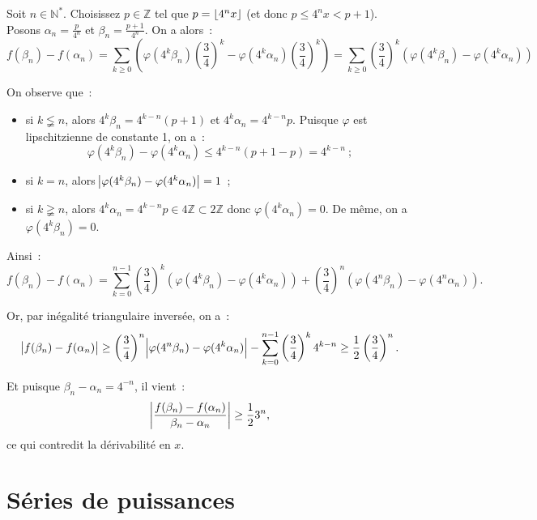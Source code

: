 \documentclass{report}
\theoremstyle{definition}
\theoremstyle{remark}
\numberwithin{equation}{section}
\newcommand{\Z}{\mathbb Z}
\newcommand{\N}{\mathbb N}
\newcommand{\Ns}{\N^{*}}
\DeclarePairedDelimiter{\floor}{\lfloor}{\rfloor}
\begin{document}
			Soit $n \in \Ns$. Choisissez $p \in \Z$ tel que $p = \floor {4^nx}$ (et donc $p \leq 4^nx < p+1$). Posons $\alpha_n = \frac p{4^n}$ et
			$\beta_n = \frac {p+1}{4^n}$. On a alors~:
			\begin{equation}
				f(\beta_n) - f(\alpha_n) = \sum_{k \geq 0}\left(\varphi(4^k\beta_n)\left(\frac 34\right)^k - \varphi(4^k\alpha_n)\left(\frac 34\right)^k\right)
				= \sum_{k \geq 0}\left(\frac 34\right)^k\left(\varphi(4^k\beta_n) - \varphi(4^k\alpha_n)\right)
			\end{equation}

			On observe que~:
			\begin{itemize}
				\item si $k \lneqq n$, alors $4^k\beta_n = 4^{k-n}(p+1)$ et $4^k\alpha_n = 4^{k-n}p$. Puisque $\varphi$ est lipschitzienne de constante 1, on a~:
					\begin{equation}
						\varphi(4^k\beta_n) - \varphi(4^k\alpha_n) \leq 4^{k-n}(p+1-p) = 4^{k-n}~;
					\end{equation}
				\item si $k = n$, alors $\abs {\varphi(4^k\beta_n) - \varphi(4^k\alpha_n)} = 1$~;
				\item si $k \gneqq n$, alors $4^k\alpha_n = 4^{k-n}p \in 4\Z \subset 2\Z$ donc $\varphi(4^k\alpha_n) = 0$.
					De même, on a $\varphi(4^k\beta_n) = 0$.
			\end{itemize}

			Ainsi~:
			\begin{equation}
				f(\beta_n) - f(\alpha_n) = \sum_{k=0}^{n-1}\left(\frac 34\right)^k\left(\varphi(4^k\beta_n) - \varphi(4^k\alpha_n)\right) +
				\left(\frac 34\right)^n\left(\varphi(4^n\beta_n) - \varphi(4^n\alpha_n)\right).
			\end{equation}

			Or, par inégalité triangulaire inversée, on a~:
			\begin{equation}
				\abs {f(\beta_n) - f(\alpha_n)} \geq \left(\frac 34\right)^n\abs {\varphi(4^n\beta_n) - \varphi(4^k\alpha_n)}
				- \sum_{k=0}^{n-1}\left(\frac 34\right)^k4^{k-n} \geq \frac 12\left(\frac 34\right)^n.
			\end{equation}

			Et puisque $\beta_n - \alpha_n = 4^{-n}$, il vient~:
			\begin{equation}
				\abs {\frac {f(\beta_n) - f(\alpha_n)}{\beta_n - \alpha_n}} \geq \frac 123^n,
			\end{equation}
			ce qui contredit la dérivabilité en $x$.
	\section{Séries de puissances}\label{sec:séries de puissances}
\end{document}
